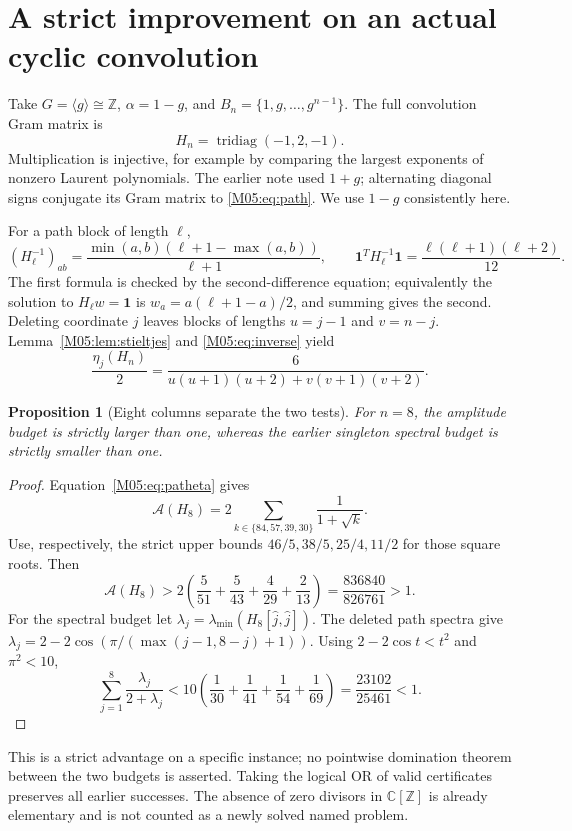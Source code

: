 \documentclass[11pt,a4paper,oneside]{report}
\newtheorem{proposition}[theorem]{Proposition}
\theoremstyle{definition}
\theoremstyle{remark}
\newcommand{\C}{\mathbb C}
\newcommand{\Z}{\mathbb Z}
\newcommand{\one}{\mathbf 1}
\newcommand{\ABudget}{\mathcal A}
\begin{document}
\section{A strict improvement on an actual cyclic convolution}
\label{M05:sec:eight}

Take $G=\langle g\rangle\cong\Z$, $\alpha=1-g$, and
$B_n=\{1,g,\ldots,g^{n-1}\}$. The full convolution Gram matrix is
\begin{equation}\label{M05:eq:path}
 H_n=\operatorname{tridiag}(-1,2,-1).
\end{equation}
Multiplication is injective, for example by comparing the largest
exponents of nonzero Laurent polynomials.
The earlier note used $1+g$; alternating diagonal signs conjugate
its Gram matrix to \eqref{M05:eq:path}. We use $1-g$ consistently here.

For a path block of length $\ell$,
\begin{equation}\label{M05:eq:pathinverse}
 (H_\ell^{-1})_{ab}
 =\frac{\min(a,b)(\ell+1-\max(a,b))}{\ell+1},
 \qquad
 \one^TH_\ell^{-1}\one
 =\frac{\ell(\ell+1)(\ell+2)}{12}.
\end{equation}
The first formula is checked by the second-difference equation;
equivalently the solution to $H_\ell w=\one$ is
$w_a=a(\ell+1-a)/2$, and summing gives the second.
Deleting coordinate $j$ leaves blocks of lengths $u=j-1$ and
$v=n-j$. Lemma~\ref{M05:lem:stieltjes} and
\eqref{M05:eq:inverse} yield
\begin{equation}\label{M05:eq:patheta}
 \frac{\eta_j(H_n)}2
 =\frac6{u(u+1)(u+2)+v(v+1)(v+2)} .
\end{equation}

\begin{proposition}[Eight columns separate the two tests]\label{M05:prop:eight}
For $n=8$, the amplitude budget is strictly larger than one, whereas
the earlier singleton spectral budget is strictly smaller than one.
\end{proposition}
\begin{proof}
Equation~\eqref{M05:eq:patheta} gives
\[
 \ABudget(H_8)=2\sum_{k\in\{84,57,39,30\}}\frac1{1+\sqrt k}.
\]
Use, respectively, the strict upper bounds
$46/5,38/5,25/4,11/2$ for those square roots. Then
\begin{equation}\label{M05:eq:eightlower}
 \ABudget(H_8)>
 2\left(\frac5{51}+\frac5{43}+\frac4{29}+\frac2{13}\right)
 =\frac{836840}{826761}>1 .
\end{equation}
For the spectral budget let
$\lambda_j=\lambda_{\min}(H_8[\widehat j,\widehat j])$.
The deleted path spectra give
$\lambda_j=2-2\cos(\pi/(\max(j-1,8-j)+1))$.
Using $2-2\cos t<t^2$ and $\pi^2<10$,
\begin{equation}\label{M05:eq:eightupper}
 \sum_{j=1}^8\frac{\lambda_j}{2+\lambda_j}
 <10\left(\frac1{30}+\frac1{41}+\frac1{54}+\frac1{69}\right)
 =\frac{23102}{25461}<1 .
\end{equation}
\end{proof}
This is a strict advantage on a specific instance; no pointwise
domination theorem between the two budgets is asserted. Taking
the logical OR of valid certificates preserves all earlier successes.
The absence of zero divisors in $\C[\Z]$ is already elementary and
is not counted as a newly solved named problem.
\end{document}
